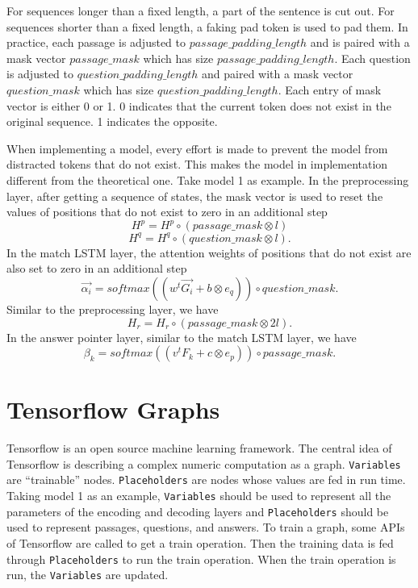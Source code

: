 \documentclass[modernstyle,12pt]{sjsuthesis}
\theoremstyle{definition}
\begin{document}
For sequences longer than a fixed length, a part of the sentence is cut out. For sequences shorter than a fixed length, a faking pad token is used to pad them. In practice, each passage is adjusted to $passage\_padding\_length$ and is paired with a mask vector $passage\_mask$ which has size $passage\_padding\_length$. Each question is adjusted to $question\_padding\_length$ and paired with a mask vector $question\_mask$ which has size $question\_padding\_length$. Each entry of mask vector is either 0 or 1. 0 indicates that the current token does not exist in the original sequence. 1 indicates the opposite.

When implementing a model, every effort is made to prevent the model from distracted tokens that do not exist. This makes the model in implementation different from the theoretical one. Take model 1 as example. In the preprocessing layer, after getting a sequence of states, the mask vector is used to reset the values of positions that do not exist to zero in an additional step
$$H^p = H^p \circ (passage\_mask \otimes l)$$
$$H^q = H^q \circ (question\_mask \otimes l).$$
In the match LSTM layer, the attention weights of positions that do not exist are also set to zero in an additional step
$$\overrightarrow{\alpha _i} = softmax( (w^t\overrightarrow{G_i} + b \otimes e_q) ) \circ question\_mask .$$
Similar to the preprocessing layer, we have
$$H_r = H_r \circ (passage\_mask \otimes 2l).$$
In the answer pointer layer, similar to the match LSTM layer, we have
$$\beta _k = softmax( (v^tF_k + c \otimes e_p) ) \circ passage\_mask.$$


\section{Tensorflow Graphs}

Tensorflow is an open source machine learning framework. The central idea of Tensorflow is describing a complex numeric computation as a graph.  {\tt Variables} are ``trainable'' nodes.  {\tt Placeholders} are nodes whose values are fed in run time. Taking model 1 as an example,  {\tt Variables} should be used to represent all the parameters of the encoding and decoding layers and {\tt Placeholders} should be used to represent passages, questions, and answers. To train a graph, some APIs of Tensorflow are called to get a train operation. Then the training data is fed through {\tt Placeholders} to run the train operation. When the train operation is run, the {\tt Variables} are updated.
\end{document}
